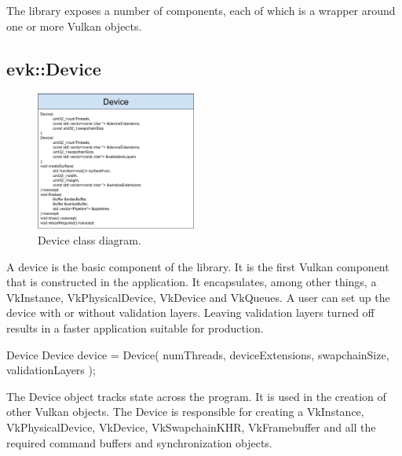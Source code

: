 \documentclass[12pt]{report}
\newcommand{\imagewidth}{0.47\textwidth}
\theoremstyle{definition}
\begin{document}
      The library exposes a number of components, each of which is a wrapper
      around one or more Vulkan objects.

      \subsection{evk::Device}

        \begin{figure}[h]
          \centering
          \includegraphics[width=\imagewidth]{images/class_device.png}
          \caption{Device class diagram.}
          \label{fig:class_device}  
        \end{figure}

        A device is the basic component of the library. It is the first Vulkan
        component that is constructed in the application. It encapsulates,
        among other things, a VkInstance, VkPhysicalDevice, VkDevice and VkQueues.
        A user can set up the device with or without validation layers. Leaving
        validation layers turned off results in a faster application suitable
        for production.

        \begin{usage}{Device}
  Device device = Device(
      numThreads, deviceExtensions, swapchainSize,
      validationLayers
  );
        \end{usage}

        The Device object tracks state across the program. It is used in the
        creation of other Vulkan objects. The Device is responsible for
        creating a VkInstance, VkPhysicalDevice, VkDevice, VkSwapchainKHR, VkFramebuffer
        and all the required command buffers and synchronization objects.\\
\end{document}
